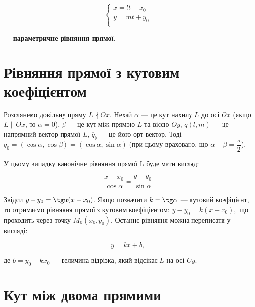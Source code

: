 $$\left\{\begin{array}{l}
	x = lt + x_0 \\
	y = mt + y_0 \\
\end{array}\right.$$

--- \textbf{параметричне рівняння прямої}.

\section{Рівняння прямої з кутовим коефіцієнтом}

\noindent\parbox{3.5cm}{}
\parbox{\textwidth - 3.6cm}{
	Розглянемо довільну пряму $L \nparallel Ox$. Нехай $\alpha$ --- це кут нахилу $L$
	до осі $Ox$ (якщо $L \parallel Ox$, то $\alpha = 0$), $\beta$ --- це кут між прямою $L$
	та віссю $Oy$, $\overline{q}(l,m)$ --- це напрямний вектор прямої $L$, $\overline{q}_0$ ---
	це його орт-вектор. Тоді $\overline{q}_0 = (\cos \alpha, \cos \beta) = (\cos \alpha, \sin \alpha)$ (при
	цьому враховано, що $\alpha + \beta = \dfrac{\pi}{2}$). 
}

У цьому випадку канонічне рівняння прямої L буде мати вигляд:

$$\dfrac{x - x_0}{\cos\alpha} = \dfrac{y - y_0}{\sin\alpha}$$

Звідси $y - y_0 = \tg\alpha(x - x_0)$. Якщо позначити $k = \tg\alpha$ --- кутовий коефіцієнт,
то отримаємо рівняння прямої з кутовим коефіцієнтом:
$y - y_0 = k(x - x_0),$
що проходить через точку $M_0(x_0, y_0)$.
Останнє рівняння можна переписати у вигляді:

$$y = kx + b,$$

де $b = y_0 - kx_0$ --- величина відрізка, який відсікає $L$ на осі $Oy$. 

\section{Кут між двома прямими}

